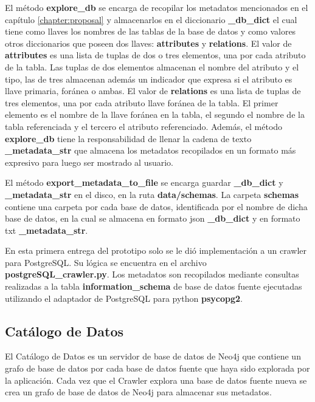 El método \textbf{explore\_db} se encarga de recopilar los metadatos mencionados en el capítulo \ref{chapter:proposal}
y almacenarlos en el diccionario \textbf{\_db\_dict} el cual tiene como llaves los nombres de las tablas de la base 
de datos y como valores otros diccionarios que poseen dos llaves: \textbf{attributes} y \textbf{relations}. 
El valor de \textbf{attributes} es una lista de tuplas de dos o tres elementos, una por cada atributo de la tabla. 
Las tuplas de dos elementos almacenan el nombre del atributo y el tipo, las de tres almacenan además un indicador 
que expresa si el atributo es llave primaria, for\'anea o ambas. El valor de \textbf{relations} es una lista de 
tuplas de tres elementos, una por cada atributo llave for\'anea de la tabla. El primer elemento es el nombre 
de la llave for\'anea en la tabla, el segundo el nombre de la tabla referenciada y el tercero el atributo referenciado. 
Además, el método \textbf{explore\_db} tiene la responsabilidad de llenar la cadena de texto \textbf{\_metadata\_str} 
que almacena los metadatos recopilados en un formato m\'as expresivo para luego ser mostrado al usuario.

El método \textbf{export\_metadata\_to\_file} se encarga guardar \textbf{\_db\_dict} y \textbf{\_metadata\_str} en el disco, 
en la ruta \textbf{data/schemas}. La carpeta \textbf{schemas} contiene una carpeta por cada base de datos, identificada 
por el nombre de dicha base de datos, en la cual se almacena en formato json \textbf{\_db\_dict} y en formato txt 
\textbf{\_metadata\_str}.

En esta primera entrega del prototipo solo se le di\'o implementación a un crawler para PostgreSQL. Su l\'ogica 
se encuentra en el archivo \textbf{postgreSQL\_crawler.py}. Los metadatos son recopilados mediante consultas realizadas
a la tabla \textbf{information\_schema} de base de datos fuente ejecutadas 
utilizando el adaptador de PostgreSQL para python \textbf{psycopg2}.




\subsection{Catálogo de Datos}

El Catálogo de Datos es un servidor de base de datos de Neo4j que contiene un grafo de base de datos por cada base de datos 
fuente que haya sido explorada por la aplicación. Cada vez que el Crawler explora una base de datos fuente nueva se crea 
un grafo de base de datos de Neo4j para almacenar sus metadatos.

